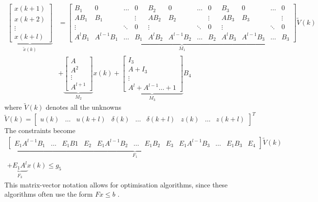 \begin{align}
    \underbrace{\begin{bmatrix} x(k+1)\\ x(k+2)\\\vdots\\x(k+l)\end{bmatrix}}_{\tilde{x}(k)} &=  \underbrace{\begin{bmatrix*}
    B_1 & 0 & \dots & 0 &                   B_2 & 0 & \dots & 0 &                   B_3  & 0 & \dots & 0\\
    AB_1& B_1 &  & \vdots &                 AB_2& B_2 &  & \vdots &                 AB_3 & B_3 &  & \vdots\\
    \vdots&  & \ddots & 0 &                 \vdots&  & \ddots & 0 &                 \vdots &  & \ddots & 0\\
    A^{l}B_1&  A^{l-1}B_1 & \dots &  B_1 & A^{l}B_2 &  A^{l-1}B_2 & \dots &  B_2 & A^{l}B_3 &  A^{l-1}B_3 & \dots &  B_3\end{bmatrix*}}_{M_1}\tilde{V}(k)\nonumber\\
    &+ \underbrace{\begin{bmatrix} A\\A^2\\\vdots\\A^{l+1}\end{bmatrix}}_{M_2}x(k) +  \underbrace{\begin{bmatrix} I_3\\A+I_3\\\vdots\\A^{l} + A^{l-1} \dots + 1 \end{bmatrix}}_{M_3}B_4 \label{eq:step27_tildedyn}
\end{align}
where $\tilde{V}(k)$ denotes all the unknowns
$$
    \tilde{V}(k)  =\begin{bmatrix} u(k)& \dots& u(k+l)& \delta(k)& \dots& \delta(k+l)& z(k) & \dots & z(k+l)\end{bmatrix}^T
$$
The constraints become 
\setcounter{MaxMatrixCols}{12}
\begin{gather}
    \underbrace{\begin{bmatrix} E_1A^{l-1}B_1 &\dots& E_1B1 & E_2 & E_1A^{l-1}B_2 & \dots & E_1B_2 & E_3 & E_1A^{l-1}B_3 & \dots & E_1B_3 & E_4 \end{bmatrix}}_{F_1} \tilde{V}(k)\nonumber\\
    + \underbrace{E_1A^l}_{F_3}x(k)\leq g_5 \label{$eq:step27_F$}
\end{gather}
This matrix-vector notation allows for optimisation algorithms, since these algorithms often use the form $Fx\leq b$ .